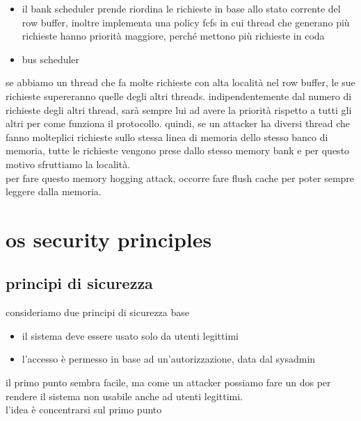 \documentclass[12pt, oneside]{extbook} %
\begin{document}
\begin{itemize}
\item il bank scheduler prende riordina le richieste in base allo stato corrente del row buffer, inoltre implementa una policy fcfs in cui thread che generano più richieste hanno priorità maggiore, perché mettono più richieste in coda
\item bus scheduler 
\end{itemize}
se abbiamo un thread che fa molte richieste con alta località nel row buffer, le sue richieste supereranno quelle degli altri threads. indipendentemente dal numero di richieste degli altri thread, sarà sempre lui ad avere la priorità rispetto a tutti gli altri per come funziona il protocollo. quindi, se un attacker ha diversi thread che fanno molteplici richieste sullo stessa linea di memoria dello stesso banco di memoria, tutte le richieste vengono prese dallo stesso memory bank e per questo motivo sfruttiamo la località.\\per fare questo memory hogging attack, occorre fare flush cache per poter sempre leggere dalla memoria.


\chapter{os security principles}

\section{principi di sicurezza}
consideriamo due principi di sicurezza base
\begin{itemize}
\item il sistema deve essere usato solo da utenti legittimi
\item l'accesso è permesso in base ad un'autorizzazione, data dal sysadmin
\end{itemize}
il primo punto sembra facile, ma come un attacker possiamo fare un dos per rendere il sistema non usabile anche ad utenti legittimi.\\l'idea è concentrarsi sul primo punto
\end{document}
